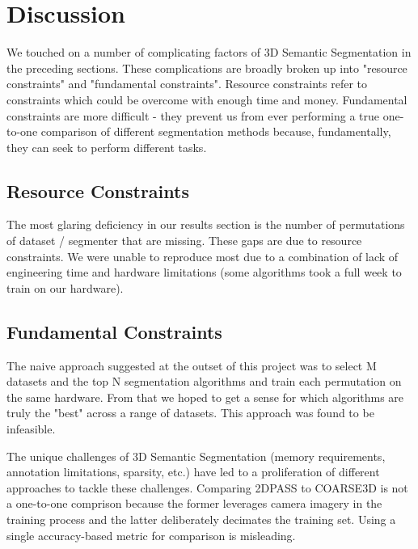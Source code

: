 \section{Discussion}
\label{chap:discussion}

We touched on a number of complicating factors of 3D Semantic Segmentation in the preceding sections. These complications are broadly broken up into "resource constraints" and "fundamental constraints". Resource constraints refer to constraints which could be overcome with enough time and money. Fundamental constraints are more difficult - they prevent us from ever performing a true one-to-one comparison of different segmentation methods because, fundamentally, they can seek to perform different tasks.

\subsection{Resource Constraints}
\label{sec:resource-constraints}

The most glaring deficiency in our results section is the number of permutations of dataset / segmenter that are missing. These gaps are due to resource constraints. We were unable to reproduce most due to a combination of lack of engineering time and hardware limitations (some algorithms took a full week to train on our hardware).

\subsection{Fundamental Constraints}
\label{sec:fundamental-constraints}

The naive approach suggested at the outset of this project was to select M datasets and the top N segmentation algorithms and train each permutation on the same hardware. From that we hoped to get a sense for which algorithms are truly the "best" across a range of datasets. This approach was found to be infeasible.

The unique challenges of 3D Semantic Segmentation (memory requirements, annotation limitations, sparsity, etc.) have led to a proliferation of different approaches to tackle these challenges. Comparing 2DPASS to COARSE3D is not a one-to-one comprison because the former leverages camera imagery in the training process and the latter deliberately decimates the training set. Using a single accuracy-based metric for comparison is misleading.

